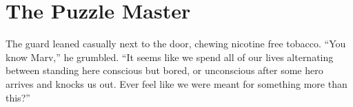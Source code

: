 \documentclass[showtrims,b6paper,draft,10pt]{memoir}
\begin{document}
\begin{comment}
The most prominent memorial was the great statue in the middle of the ground of Patrick Smith, the man who lead the First Heroes in overthrowing King George, the infamous last of the kings who had decided that oppressing his subjects was simply more `fun' than serving them.  This, however, was not why he was honored, for many heros had defeated great enemies, but no other had their statue in this ground.  What made Patrick special was that after leading the First Heroes to overthrow the King, in the moment when the people had been willing to crown him their ruler in their stead, he refused the honor and instead created a parliamentary democracy to govern the land.  He and the First Heroes together founded the Order of Heroes, and by his insistence it was deliberately made subservient to the parliament;  on the platform below his statue is carved the calling of the Heroes of the Order:  ``We fight to protect, not to rule.''  His figure is protrayed on one knee, with a sword held high in one hand and a child cradled against him in the other.

If anyone had doubt in the commitment of the Order in carrying out its mission over the last three hundred years, it would be immediately dispelled by the plain stones surrounding the statue -- stones filled with names, hundreds of names, of the heroes who had died in service.  Every time Christina walked past the stones, she would reach out and touch some of the names.  No woman's name appeared on the stones, and in a way she was glad of this;  since she had been the first woman admitted to the order, if a name were to appear on the stones in the near future it would be her own!

She continued quietly on her way to her commander's office, sobered both by the memorial ground and also by thoughts of the briefing she was going to have to give him shortly.

\timeskip


\end{comment}
\chapter{The Puzzle Master}

The guard leaned casually next to the door, chewing nicotine free tobacco.  “You know Marv,” he grumbled.  “It seems like we spend all of our lives alternating between standing here conscious but bored, or unconscious after some hero arrives and knocks us out.  Ever feel like we were meant for something more than this?”
\end{document}
